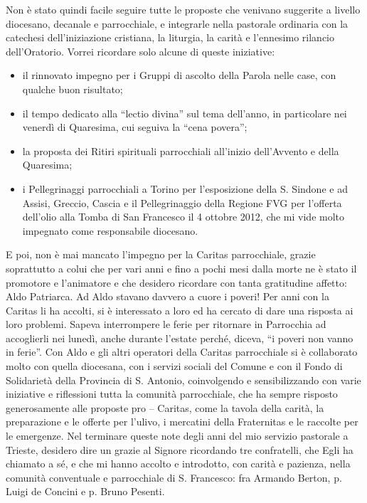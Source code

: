 Non è stato quindi facile seguire tutte le proposte che venivano suggerite a livello diocesano, 
decanale e parrocchiale, e integrarle nella pastorale ordinaria con la catechesi dell'iniziazione 
cristiana, la liturgia, la carità e l'ennesimo rilancio dell'Oratorio. 
Vorrei ricordare solo alcune di queste iniziative:
\begin{itemize}
	\item il rinnovato impegno per i Gruppi di ascolto della Parola nelle case, con qualche buon risultato;
	\item il tempo dedicato alla “lectio divina” sul tema dell'anno, in particolare nei venerdì di Quaresima, 
cui seguiva la “cena povera”;
	\item la proposta dei Ritiri spirituali parrocchiali all'inizio dell'Avvento e della Quaresima;
	\item i Pellegrinaggi parrocchiali a Torino per l'esposizione della S. Sindone e ad Assisi, Greccio, 
Cascia e il Pellegrinaggio della Regione FVG per l'offerta dell'olio alla Tomba di San Francesco il 4 
ottobre 2012, che mi vide molto impegnato come responsabile diocesano.
\end{itemize}
E poi, non è mai mancato l'impegno per la Caritas parrocchiale, grazie soprattutto a colui 
che per vari anni e fino a pochi mesi dalla morte ne è stato il promotore e l'animatore e che desidero 
ricordare con tanta gratitudine affetto: Aldo Patriarca. 
Ad Aldo stavano davvero a cuore i poveri! Per anni con la Caritas li ha accolti, si è interessato a 
loro ed ha cercato di dare una risposta ai loro problemi.
Sapeva interrompere le ferie per ritornare in Parrocchia ad accoglierli nei lunedì, anche durante 
l'estate perché, diceva, “i poveri non vanno in ferie”.
Con Aldo e gli altri operatori della Caritas parrocchiale si è collaborato molto con quella diocesana, 
con i servizi sociali del Comune e con il Fondo di Solidarietà della Provincia di S. Antonio, 
coinvolgendo e sensibilizzando con varie iniziative e riflessioni tutta la comunità parrocchiale, che 
ha sempre risposto generosamente alle proposte pro – Caritas, come la tavola della carità, la 
preparazione e le offerte per l'ulivo, i mercatini della Fraternitas e le raccolte per le emergenze.
Nel  terminare queste note degli anni del mio servizio pastorale a Trieste, desidero dire un 
grazie al Signore ricordando tre confratelli, che Egli ha chiamato a sé, e che mi hanno accolto e 
introdotto, con carità e pazienza, nella comunità conventuale e parrocchiale di S. Francesco: fra 
Armando Berton, p. Luigi de Concini e p. Bruno Pesenti.
